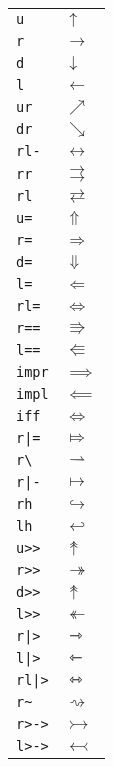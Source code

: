 \begin{longtable}{ll}
\texttt{u}&${}\uparrow {}$\\
\texttt{r}&${}\rightarrow {}$\\
\texttt{d}&${}\downarrow {}$\\
\texttt{l}&${}\leftarrow {}$\\
\texttt{ur}&${}\nearrow {}$\\
\texttt{dr}&${}\searrow {}$\\
\texttt{rl{-}}&${}\leftrightarrow {}$\\
\texttt{rr}&${}\rightrightarrows {}$\\
\texttt{rl}&${}\rightleftarrows {}$\\
\texttt{u=}&${}\Uparrow {}$\\
\texttt{r=}&${}\Rightarrow {}$\\
\texttt{d=}&${}\Downarrow {}$\\
\texttt{l=}&${}\Leftarrow {}$\\
\texttt{rl=}&${}\Leftrightarrow {}$\\
\texttt{r==}&${}\Rrightarrow {}$\\
\texttt{l==}&${}\Lleftarrow {}$\\
\texttt{impr}&${}\implies {}$\\
\texttt{impl}&${}\impliedby {}$\\
\texttt{iff}&${}\iff {}$\\
\texttt{r|=}&${}\Mapsto {}$\\
\texttt{r\textbackslash }&${}\rightharpoonup {}$\\
\texttt{r|{-}}&${}\mapsto {}$\\
\texttt{rh}&${}\hookrightarrow {}$\\
\texttt{lh}&${}\hookleftarrow {}$\\
\texttt{u>>}&${}\twoheaduparrow {}$\\
\texttt{r>>}&${}\twoheadrightarrow {}$\\
\texttt{d>>}&${}\twoheaduparrow {}$\\
\texttt{l>>}&${}\twoheadleftarrow {}$\\
\texttt{r|>}&${}\rightarrowtriangle {}$\\
\texttt{l|>}&${}\leftarrowtriangle {}$\\
\texttt{rl|>}&${}\leftrightarrowtriangle {}$\\
\texttt{r\textasciitilde }&${}\rightsquigarrow {}$\\
\texttt{r>{-}>}&${}\rightarrowtail {}$\\
\texttt{l>{-}>}&${}\leftarrowtail {}$\\

\end{longtable}
